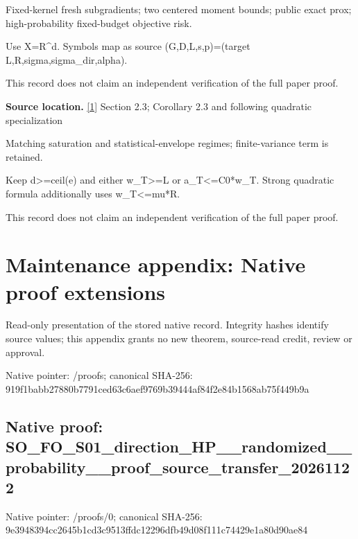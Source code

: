 \documentclass[10pt,a4paper]{article}
\begin{document}
Fixed-kernel fresh subgradients; two centered moment bounds; public exact prox; high-probability fixed-budget objective risk.



Use X=R\textasciicircum{}d. Symbols map as source (G,D,L,s,p)=(target L,R,sigma,sigma\_dir,alpha).



This record does not claim an independent verification of the full paper proof.



\textbf{Source location.} \href{https://arxiv.org/html/2610.00260v2}{[1]} Section 2.3; Corollary 2.3 and following quadratic specialization



Matching saturation and statistical-envelope regimes; finite-variance term is retained.



Keep d>=ceil(e) and either w\_T>=L or a\_T<=C0*w\_T. Strong quadratic formula additionally uses w\_T<=mu*R.



This record does not claim an independent verification of the full paper proof.



\section{Maintenance appendix: Native proof extensions}


Read-only presentation of the stored native record. Integrity hashes identify source values; this appendix grants no new theorem, source-read credit, review or approval.



Native pointer: /proofs; canonical SHA-256: 919f1babb27880b7791ced63\allowbreak{}c6aef9769b39444af84f2e84\allowbreak{}b1568ab75f449b9a



\subsection{Native proof: SO\_FO\_S01\_direction\_HP\_\_\allowbreak{}randomized\_\_probability\_\allowbreak{}\_proof\_source\_transfer\_2\allowbreak{}0261122}


Native pointer: /proofs/0; canonical SHA-256: 9e3948394cc2645b1cd3c951\allowbreak{}3ffdc12296dfb49d08f111c7\allowbreak{}4429e1a80d90ae84
\end{document}
